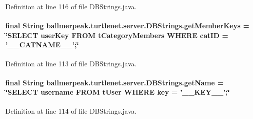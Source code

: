 Definition at line 116 of file D\-B\-Strings.\-java.

\hypertarget{classballmerpeak_1_1turtlenet_1_1server_1_1DBStrings_af52ab80c3167b21dd0b8c7c61e498e61}{
\paragraph[{get\-Member\-Keys}]{\setlength{\rightskip}{0pt plus 5cm}final String ballmerpeak.\-turtlenet.\-server.\-D\-B\-Strings.\-get\-Member\-Keys = \char`\"{}S\-E\-L\-E\-C\-T user\-Key F\-R\-O\-M t\-Category\-Members W\-H\-E\-R\-E cat\-I\-D = '\-\_\-\-\_\-\-C\-A\-T\-N\-A\-M\-E\-\_\-\-\_\-';\char`\"{}\hspace{0.3cm}{\ttfamily [static]}}}\label{classballmerpeak_1_1turtlenet_1_1server_1_1DBStrings_af52ab80c3167b21dd0b8c7c61e498e61}


Definition at line 113 of file D\-B\-Strings.\-java.

\hypertarget{classballmerpeak_1_1turtlenet_1_1server_1_1DBStrings_a1a166aed33e92e5a9990201b6d426e07}{
\paragraph[{get\-Name}]{\setlength{\rightskip}{0pt plus 5cm}final String ballmerpeak.\-turtlenet.\-server.\-D\-B\-Strings.\-get\-Name = \char`\"{}S\-E\-L\-E\-C\-T username F\-R\-O\-M t\-User W\-H\-E\-R\-E key = '\-\_\-\-\_\-\-K\-E\-Y\-\_\-\-\_\-';\char`\"{}\hspace{0.3cm}{\ttfamily [static]}}}\label{classballmerpeak_1_1turtlenet_1_1server_1_1DBStrings_a1a166aed33e92e5a9990201b6d426e07}


Definition at line 114 of file D\-B\-Strings.\-java.

